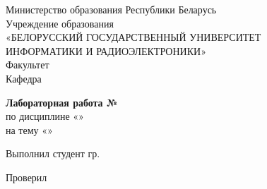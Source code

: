 \begin{titlepage}
  \begin{center}
    Министерство образования Республики Беларусь\\[1em]
    Учреждение образования\\
    «БЕЛОРУССКИЙ ГОСУДАРСТВЕННЫЙ УНИВЕРСИТЕТ\\
    ИНФОРМАТИКИ И РАДИОЭЛЕКТРОНИКИ»\\[1em]

    Факультет \labFaculty\\
    Кафедра \labDepartment

    \vspace{5em}

    \textbf{\large Лабораторная работа №\labNumber}\\[1em]
    по дисциплине «\labDiscipline»\\[1em]
    на тему «\labTopic»

    \vspace{6em}

    \begin{minipage}{0.45\textwidth}
      Выполнил студент гр. \labStudentGroup
    \end{minipage}
    \hspace{3em}
    \begin{minipage}{0.35\textwidth}
      \labStudentName
    \end{minipage}

    \vspace{2em}

    \begin{minipage}{0.45\textwidth}
      Проверил
    \end{minipage}
    \hspace{3em}
    \begin{minipage}{0.35\textwidth}
      \labTeacherName
    \end{minipage}

    \vfill
    {\normalsize \labCity{} \labYear}
  \end{center}
\end{titlepage}
